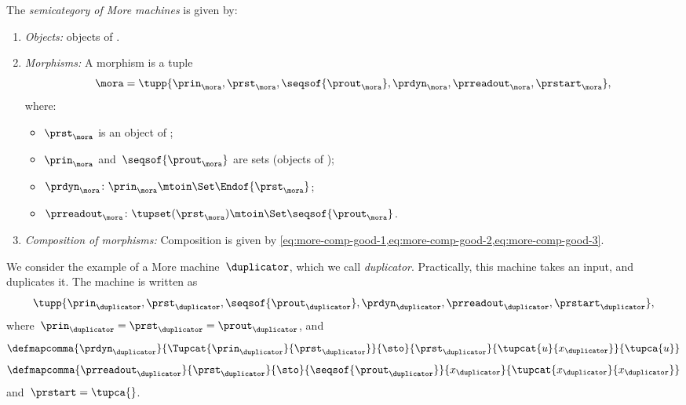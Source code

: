 \begin{definition}[\More]
    \label{def:More}
    The \emph{semicategory of More machines} \More is given by:
    \begin{enumerate}
        \item \emph{Objects:} objects of \Set.
        \item \emph{Morphisms:}
              A morphism is a tuple
              \begin{equation}
                  \mora = \tupp{\prin_{\mora},\prst_{\mora},\seqsof{\prout_{\mora}},\prdyn_{\mora},\prreadout_{\mora},\prstart_{\mora}},
              \end{equation}
              where:
              \begin{itemize}
                  \item $\prst_{\mora}$ is an object of \SetL;
                  \item $\prin_{\mora}$ and~$\seqsof{\prout_{\mora}}$ are sets (objects of \Set);
                  \item $ \prdyn_{\mora} \colon \prin_{\mora} \mtoin\Set \Endof{\prst_{\mora}}$;
                  \item $ \prreadout_{\mora} \colon \tupset(\prst_{\mora})  \mtoin\Set \seqsof{\prout_{\mora}}$.
              \end{itemize}
        \item \emph{Composition of morphisms:}
              Composition is given by \cref{eq:more-comp-good-1,eq:more-comp-good-2,eq:more-comp-good-3}.
    \end{enumerate}
\end{definition}

\begin{example}[Duplicator]
    We consider the example of a More machine~$\duplicator$, which we call \emph{duplicator}.
    Practically, this machine takes an input, and duplicates it.
    The machine is written as
    \begin{equation*}
        \tupp{\prin_{\duplicator},\prst_{\duplicator},\seqsof{\prout_{\duplicator}},\prdyn_{\duplicator},\prreadout_{\duplicator},\prstart_{\duplicator}},
    \end{equation*}
    where~$\prin_{\duplicator}=\prst_{\duplicator}=\prout_\duplicator$, and
    \begin{equation*}
        \defmapcomma{\prdyn_\duplicator}
        {\Tupcat{\prin_\duplicator}{\prst_\duplicator}}
        {\sto}
        {\prst_\duplicator}
        {\tupcat{u}{x_\duplicator}}
        {\tupca{u}}
    \end{equation*}
    \begin{equation*}
        \defmapcomma{\prreadout_\duplicator}
        {\prst_\duplicator}
        {\sto}
        {\seqsof{\prout_\duplicator}}
        {x_\duplicator}
        {\tupcat{x_\duplicator}{x_\duplicator}}
    \end{equation*}
    and~$\prstart=\tupca{}$.
\end{example}

